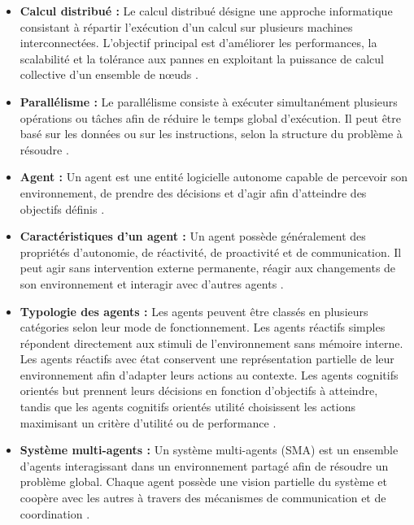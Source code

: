 \documentclass[12pt,a4paper]{report}
\begin{document}
\begin{itemize}

    \item[$\bullet$] \textbf{Calcul distribué :} Le calcul distribué désigne une approche informatique consistant à répartir l'exécution d'un calcul sur plusieurs machines interconnectées. L'objectif principal est d'améliorer les performances, la scalabilité et la tolérance aux pannes en exploitant la puissance de calcul collective d'un ensemble de nœuds \cite{tanenbaum_ds}.

    \item[$\bullet$] \textbf{Parallélisme :} Le parallélisme consiste à exécuter simultanément plusieurs opérations ou tâches afin de réduire le temps global d'exécution. Il peut être basé sur les données ou sur les instructions, selon la structure du problème à résoudre \cite{tanenbaum_ds}.

    \item[$\bullet$] \textbf{Agent :} Un agent est une entité logicielle autonome capable de percevoir son environnement, de prendre des décisions et d'agir afin d'atteindre des objectifs définis \cite{wooldridge}.

    \item[$\bullet$] \textbf{Caractéristiques d'un agent :} Un agent possède généralement des propriétés d'autonomie, de réactivité, de proactivité et de communication. Il peut agir sans intervention externe permanente, réagir aux changements de son environnement et interagir avec d'autres agents \cite{wooldridge}.

    \item[$\bullet$] \textbf{Typologie des agents :} Les agents peuvent être classés en plusieurs catégories selon leur mode de fonctionnement. Les agents réactifs simples répondent directement aux stimuli de l'environnement sans mémoire interne. Les agents réactifs avec état conservent une représentation partielle de leur environnement afin d'adapter leurs actions au contexte. Les agents cognitifs orientés but prennent leurs décisions en fonction d'objectifs à atteindre, tandis que les agents cognitifs orientés utilité choisissent les actions maximisant un critère d'utilité ou de performance \cite{wooldridge}.

    \item[$\bullet$] \textbf{Système multi-agents :} Un système multi-agents (SMA) est un ensemble d'agents interagissant dans un environnement partagé afin de résoudre un problème global. Chaque agent possède une vision partielle du système et coopère avec les autres à travers des mécanismes de communication et de coordination \cite{wooldridge}.


\end{itemize}
\end{document}
